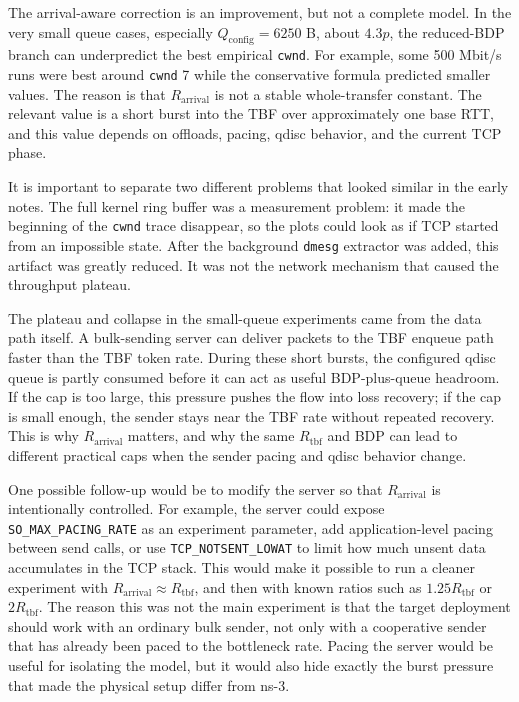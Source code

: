 \documentclass{article}
\newcommand{\code}[1]{\texttt{#1}}
\begin{document}
The arrival-aware correction is an improvement, but not a complete model. In the very small queue cases, 
especially \(Q_{\mathrm{config}} = 6250\) B, about \(4.3p\), the reduced-BDP branch can underpredict the best empirical \code{cwnd}. 
For example, some 500 Mbit/s runs were best around \code{cwnd} 7 while the conservative formula predicted smaller values. 
The reason is that \(R_{\mathrm{arrival}}\) is 
not a stable whole-transfer constant. The relevant value is a short burst into the TBF over approximately 
one base RTT, and this value depends on offloads, pacing, qdisc behavior, and the current TCP phase.


It is important to separate two different problems that looked similar in the early notes. The full kernel ring buffer 
was a measurement problem: it made the beginning of the \code{cwnd} trace disappear, so the plots could look as if TCP 
started from an impossible state. After the background \code{dmesg} extractor was added, this artifact was greatly 
reduced. It was not the network mechanism that caused the throughput plateau.

The plateau and collapse in the small-queue experiments came from the data path itself. A bulk-sending server can 
deliver packets to the TBF enqueue path faster than the TBF token rate. During these short bursts, the configured 
qdisc queue is partly consumed before it can act as useful BDP-plus-queue headroom. If the cap is too large, this 
pressure pushes the flow into loss recovery; if the cap is small enough, the sender stays near the TBF rate without 
repeated recovery. This is why \(R_{\mathrm{arrival}}\) matters, and why the same \(R_{\mathrm{tbf}}\) and BDP can lead 
to different practical caps when the sender pacing and qdisc behavior change.

One possible follow-up would be to modify the server so that \(R_{\mathrm{arrival}}\) is intentionally controlled. 
For example, the server could expose \code{SO\_MAX\_PACING\_RATE} as an experiment parameter, add application-level 
pacing between send calls, or use \code{TCP\_NOTSENT\_LOWAT} to limit how much unsent data accumulates in the TCP stack. 
This would make it possible to run a cleaner experiment with \(R_{\mathrm{arrival}} \approx R_{\mathrm{tbf}}\), and then 
with known ratios such as \(1.25R_{\mathrm{tbf}}\) or \(2R_{\mathrm{tbf}}\). The reason this was not the main experiment 
is that the target deployment should work with an ordinary bulk sender, not only with a cooperative sender that has 
already been paced to the bottleneck rate. Pacing the server would be useful for isolating the model, but it would 
also hide exactly the burst pressure that made the physical setup differ from ns-3.
\end{document}
